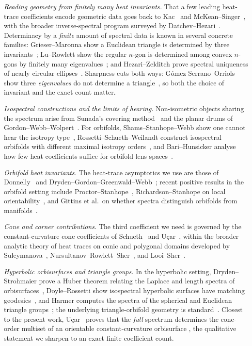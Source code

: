 \documentclass[12pt, letterpaper]{article}
\theoremstyle{definition}
\theoremstyle{plain}
\begin{document}
\emph{Reading geometry from finitely many heat invariants.} That a few leading heat-trace coefficients encode geometric data goes back to Kac~\cite{kac1966} and McKean--Singer~\cite{mckeansinger1967}, with the broader inverse-spectral program surveyed by Datchev--Hezari~\cite{datchevhezari2013}. Determinacy by a \emph{finite} amount of spectral data is known in several concrete families: Grieser--Maronna show a Euclidean triangle is determined by three invariants~\cite{griesermaronna2013}; Lu--Rowlett show the regular $n$-gon is determined among convex $n$-gons by finitely many eigenvalues~\cite{lurowlett2015}; and Hezari--Zelditch prove spectral uniqueness of nearly circular ellipses~\cite{hezarizelditch2022}. Sharpness cuts both ways: G\'omez-Serrano--Orriols show three \emph{eigenvalues} do not determine a triangle~\cite{gomezserrano2020}, so both the choice of invariant and the exact count matter.

\emph{Isospectral constructions and the limits of hearing.} Non-isometric objects sharing the spectrum arise from Sunada's covering method~\cite{sunada1985} and the planar drums of Gordon--Webb--Wolpert~\cite{gww1992}. For orbifolds, Shams--Stanhope--Webb show one cannot hear the isotropy type~\cite{ssw2006}, Rossetti--Schueth--Weilandt construct isospectral orbifolds with different maximal isotropy orders~\cite{rsw2008}, and Bari--Hunsicker analyse how few heat coefficients suffice for orbifold lens spaces~\cite{barihunsicker2017}.

\emph{Orbifold heat invariants.} The heat-trace asymptotics we use are those of Donnelly~\cite{donnelly1976} and Dryden--Gordon--Greenwald--Webb~\cite{dggw2008}; recent positive results in the orbifold setting include Proctor--Stanhope~\cite{proctorstanhope2009}, Richardson--Stanhope on local orientability~\cite{richardsonstanhope2019}, and Gittins et al.\ on whether spectra distinguish orbifolds from manifolds~\cite{gittinsetal2024}.

\emph{Cone and corner contributions.} The third coefficient we need is governed by the constant-curvature cone coefficients of Schueth~\cite{schueth2019, schueth2025} and U\c{c}ar~\cite{ucar2017}, within the broader analytic theory of heat traces on conic and polygonal domains developed by Suleymanova~\cite{suleymanova2017}, Nursultanov--Rowlett--Sher~\cite{nrs2024}, and Looi--Sher~\cite{looisher2025}.

\emph{Hyperbolic orbisurfaces and triangle groups.} In the hyperbolic setting, Dryden--Strohmaier prove a Huber theorem relating the Laplace and length spectra of orbisurfaces~\cite{drydenstrohmaier2009}, Doyle--Rossetti show isospectral hyperbolic surfaces have matching geodesics~\cite{doylerossetti2008}, and Harmer computes the spectra of the spherical and Euclidean triangle groups~\cite{harmer2008}; the underlying triangle-orbifold geometry is standard~\cite{scott1983, buser1992}. Closest to the present work, U\c{c}ar~\cite{ucar2017} proves that the \emph{full} spectrum determines the cone-order multiset of an orientable constant-curvature orbisurface ,  the qualitative statement we sharpen to an exact finite coefficient count.
\end{document}
